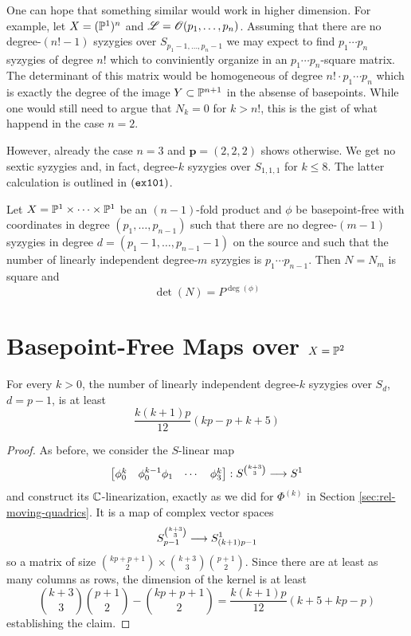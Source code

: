 \documentclass[fleqn,reqno]{amsart}
\numberwithin{first}{chapter}
\numberwithin{section}{chapter}
\numberwithin{equation}{first}
\begin{document}
\begin{remark}
	One can hope that something similar would work in higher dimension.
	For example, let $X=(\mathbb{P}^1)^{n}$ and $\mathscr{L}=\mathscr{O}(p_1,\ldots,p_{n})$.
	Assuming that there are no degree-$(n!-1)$ syzygies over $S_{p_1-1,\ldots,p_{n}-1}$
	we may expect to find $p_1\cdots p_n$ syzygies of degree $n!$
	which to conviniently organize in an $p_1\cdots p_n$-square matrix.
	The determinant of this matrix would be homogeneous of degree $n!\cdot p_1\cdots p_n$
	which is exactly the degree of the image $Y\subset\mathbb{P}^{n+1}$ in the absense of basepoints.
	While one would still need to argue that $N_k=0$ for $k>n!$,
	this is the gist of what happend in the case $n=2$.
	
	However, already the case $n=3$ and $\mathbf p=(2,2,2)$ shows otherwise.
	We get no sextic syzygies and, in fact, degree-$k$ syzygies over $S_{1,1,1}$ for $k\leq8$.
	The latter calculation is outlined in $\mathop{\tt(ex101)}$.
\end{remark}

\begin{theorem}
	Let $X=\mathbb{P}^1\times\cdots\times\mathbb{P}^1$ be an $(n-1)$-fold product and $\phi$ be basepoint-free
	with coordinates in degree $(p_1,\ldots,p_{n-1})$ such that there are no degree-$(m-1)$ syzygies in
	degree $d=(p_1-1,\ldots,p_{n-1}-1)$ on the source
	and such that the number of linearly independent degree-$m$ syzygies is $p_1\cdots p_{n-1}$.
	Then $N=N_m$ is square and
	\[
		\det(N)=P^{\deg(\phi)}
	\]
\end{theorem}






\section{Basepoint-Free Maps over $X=\mathbb{P}^2$}
\label{sec:bpf-maps-pp2}

\begin{lemma}
	\label{lemma:rel-moving-planes-quadrics-min-dims}
	For every $k>0$, the number of linearly independent degree-$k$ syzygies over $S_{d}$,
	$d=p-1$, is at least
	\[
		\frac{k(k+1)p}{12}(kp-p+k+5)
	\]
\end{lemma}

\begin{proof}
	As before, we consider the $S$-linear map
	\[
		\begin{bmatrix}\phi_0^k& \phi_0^{k-1}\phi_1& \cdots& \phi_3^k\end{bmatrix}:
		S^{\binom{k+3}{3}}\longrightarrow S^1
	\]
	and construct its $\mathbb{C}$-linearization,
	exactly as we did for $\Phi^{(k)}$ in Section \ref{sec:rel-moving-quadrics}.
	It is a map of complex vector spaces
	\[
		S_{p-1}^{\binom{k+3}{3}}\longrightarrow S_{(k+1)p-1}^1
	\]
	so a matrix of size $\binom{kp+p+1}{2}\times\binom{k+3}{3}\binom{p+1}{2}$.
	Since there are at least as many columns as rows,
	the dimension of the kernel is at least
	\[
		\binom{k+3}{3}\binom{p+1}{2}-\binom{kp+p+1}{2}=\frac{k(k+1)p}{12}(k+5+kp-p)
	\]
	establishing the claim.
\end{proof}
\end{document}
